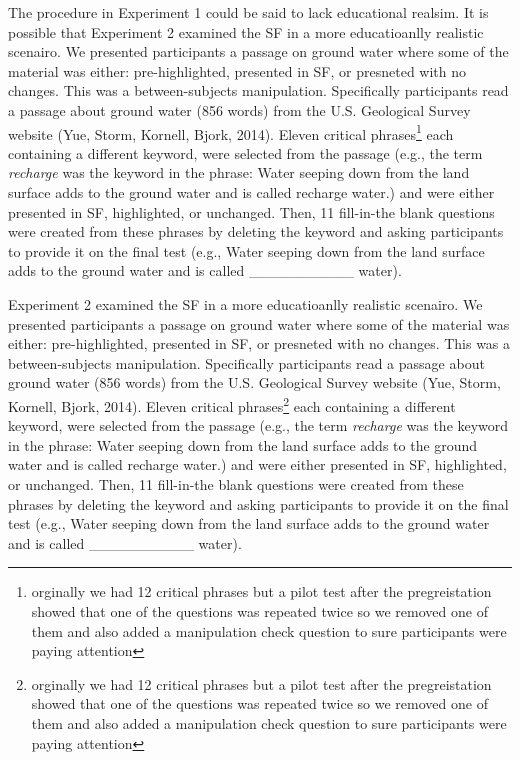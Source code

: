 \documentclass[doc]{apa6}
\begin{document}
The procedure in Experiment 1 could be said to lack educational realsim. It is possible that Experiment 2 examined the SF in a more educatioanlly realistic scenairo. We presented participants a passage on ground water where some of the material was either: pre-highlighted, presented in SF, or presneted with no changes. This was a between-subjects manipulation. Specifically participants read a passage about ground water (856 words) from the U.S. Geological Survey website (Yue, Storm, Kornell, Bjork, 2014). Eleven critical phrases\footnote{orginally we had 12 critical phrases but a pilot test after the pregreistation showed that one of the questions was repeated twice so we removed one of them and also added a manipulation check question to sure participants were paying attention} each containing a different keyword, were selected from the passage (e.g., the term \emph{recharge} was the keyword in the phrase: Water seeping down from the land surface adds to the ground water and is called recharge water.) and were either presented in SF, highlighted, or unchanged. Then, 11 fill-in-the blank questions were created from these phrases by deleting the keyword and asking participants to provide it on the final test (e.g., Water seeping down from the land surface adds to the ground water and is called \_\_\_\_\_\_\_\_\_\_ water).

Experiment 2 examined the SF in a more educatioanlly realistic scenairo. We presented participants a passage on ground water where some of the material was either: pre-highlighted, presented in SF, or presneted with no changes. This was a between-subjects manipulation. Specifically participants read a passage about ground water (856 words) from the U.S. Geological Survey website (Yue, Storm, Kornell, Bjork, 2014). Eleven critical phrases\footnote{orginally we had 12 critical phrases but a pilot test after the pregreistation showed that one of the questions was repeated twice so we removed one of them and also added a manipulation check question to sure participants were paying attention} each containing a different keyword, were selected from the passage (e.g., the term \emph{recharge} was the keyword in the phrase: Water seeping down from the land surface adds to the ground water and is called recharge water.) and were either presented in SF, highlighted, or unchanged. Then, 11 fill-in-the blank questions were created from these phrases by deleting the keyword and asking participants to provide it on the final test (e.g., Water seeping down from the land surface adds to the ground water and is called \_\_\_\_\_\_\_\_\_\_ water).
\end{document}
